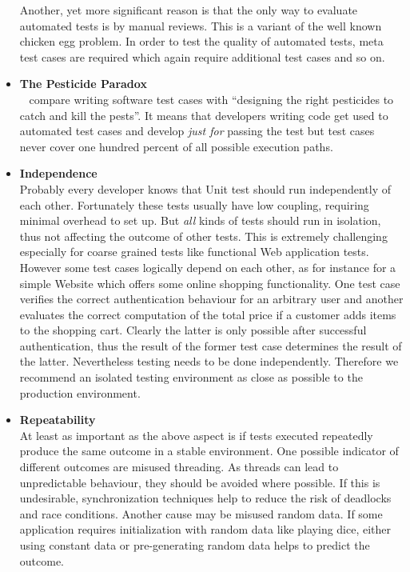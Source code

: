 \documentclass[12pt, notitlepage]{article}
\begin{document}
\begin{itemize}
	Another, yet more significant reason is that the only way to evaluate automated tests is by manual reviews. This is a variant of the well known
	chicken egg problem. In order to test the quality of automated tests, meta test cases are required which again require additional test cases and so on.
	\item \textbf{The Pesticide Paradox}\\
	~\citet{softare-testing-principles} compare writing software test cases with \enquote{designing the right pesticides to catch and kill the pests}.
	It means that developers writing code get used to automated test cases and develop \textit{just for} passing the test but test cases never cover one hundred 
	percent of all possible execution paths. 
	\item \textbf{Independence}\\
	Probably every developer knows that Unit test should run independently of each other. Fortunately these tests usually have low coupling, requiring minimal
	overhead to set up. But \textit{all} kinds of tests should run in isolation, thus not affecting the outcome of other tests.
	This is extremely challenging especially for coarse grained tests like functional Web application tests. However some test cases logically depend on each other, as for instance for a simple Website which offers some online shopping functionality. One test case verifies the correct authentication behaviour for an arbitrary user and
	another evaluates the correct computation of the total price if a customer adds items to the shopping cart.
	Clearly the latter is only possible after successful authentication, thus the result of the former test case determines the result of the latter.
	Nevertheless testing needs to be done independently. Therefore we recommend an isolated testing environment as close as possible to the production environment.
	\item \textbf{Repeatability}\\
	At least as important as the above aspect is if tests executed repeatedly produce the same outcome in a stable environment. One possible 
	indicator of different outcomes are misused threading. As threads can lead to unpredictable behaviour, they should be avoided where possible. 
	If this is undesirable, synchronization techniques help to reduce the risk of deadlocks and race conditions. 
	Another cause may be misused random data. If some application requires initialization with random data like playing dice, either using constant data
	or pre-generating random data helps to predict the outcome. 
\end{itemize}
\end{document}
